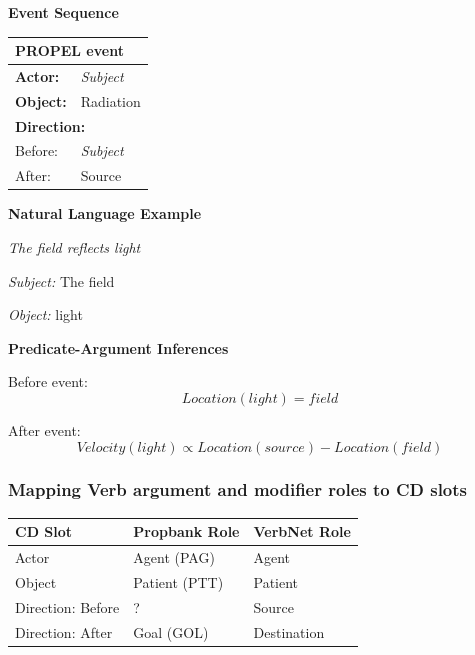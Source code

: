 \documentclass[../dissertation]{subfiles}
\begin{document}
\textbf{Event Sequence}

\begin{center}
	
	\bigskip
    
    \begin{tabular}{l l}
      \toprule
      \multicolumn{2}{l}{\textbf{PROPEL event}}\\
      \hline
      \textbf{Actor:} & \textit{Subject}\\
      \textbf{Object:} & Radiation\\
      
      \multicolumn{2}{l}{\textbf{Direction:}} \\
      Before: & \textit{Subject}\\
      After: & Source\\
      \bottomrule
    \end{tabular}
    
\end{center}

\textbf{Natural Language Example}

\textit{The field reflects light}

\textit{Subject:} The field

\textit{Object:} light

\bigskip

\textbf{Predicate-Argument Inferences}

Before event:
\[Location(light) = field\]

After event:
\[Velocity(light) \propto Location(source) - Location(field)\]

\subsubsection{Mapping Verb argument and modifier roles to CD slots}
\label{roles-to-slots}

\begin{tabular}{l l l}
  \toprule
  CD Slot & Propbank Role & VerbNet Role \\
  \midrule
  Actor & Agent (PAG) & Agent\\
  Object & Patient (PTT) & Patient\\
  Direction: Before & ? & Source \\
  Direction: After &  Goal (GOL) & Destination \\
  \bottomrule
\end{tabular}
\end{document}
